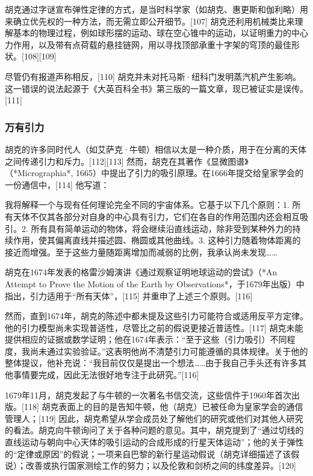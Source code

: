 胡克通过字谜宣布弹性定律的方式，是当时科学家（如胡克、惠更斯和伽利略）用来确立优先权的一种方法，而无需立即公开细节。[107] 胡克还利用机械类比来理解基本的物理过程，例如球形摆的运动、球在空心锥中的运动，以证明重力的中心力作用，以及带有点荷载的悬挂链网，用以寻找顶部承重十字架的穹顶的最佳形状。[108][109]

尽管仍有报道声称相反，[110] 胡克并未对托马斯·纽科门发明蒸汽机产生影响。这一错误的说法起源于《大英百科全书》第三版的一篇文章，现已被证实是误传。[111]

\subsubsection{万有引力}
胡克的许多同时代人（如艾萨克·牛顿）相信以太是一种介质，用于在分离的天体之间传递引力和斥力。[112][113] 然而，胡克在其著作《显微图谱》（*Micrographia*, 1665）中提出了引力的吸引原理。在1666年提交给皇家学会的一份通信中，[114] 他写道：

我将解释一个与现有任何理论完全不同的宇宙体系。它基于以下几个原则：1. 所有天体不仅其各部分对自身的中心具有引力，它们在各自的作用范围内还会相互吸引。2. 所有具有简单运动的物体，将会继续沿直线运动，除非受到某种外力的持续作用，使其偏离直线并描述圆、椭圆或其他曲线。3. 这种引力随着物体距离的接近而增强。至于这些力量随距离增加而减弱的比例，我承认尚未发现……

胡克在1674年发表的格雷沙姆演讲《通过观察证明地球运动的尝试》（*An Attempt to Prove the Motion of the Earth by Observations*，于1679年出版）中指出，引力适用于“所有天体”，[115] 并重申了上述三个原则。[116]

然而，直到1674年，胡克的陈述中都未提及这些引力可能符合或适用反平方定律。他的引力模型尚未实现普适性，尽管比之前的假说更接近普适性。[117] 胡克未能提供相应的证据或数学证明；他在1674年表示：“至于这些（引力吸引）不同程度，我尚未通过实验验证。”这表明他尚不清楚引力可能遵循的具体规律。关于他的整体提议，他补充说：“我目前仅仅是提出一个想法……由于我自己手头还有许多其他事情要完成，因此无法很好地专注于此研究。”[116]

1679年11月，胡克发起了与牛顿的一次著名书信交流，这些信件于1960年首次出版。[118] 胡克表面上的目的是告知牛顿，他（胡克）已被任命为皇家学会的通信管理人；[119] 因此，胡克希望从学会成员处了解他们的研究或他们对其他人研究的看法。胡克向牛顿询问了关于各种问题的意见。其中，胡克提到了“通过切线的直线运动与朝向中心天体的吸引运动的合成形成的行星天体运动”；他的关于弹性的“定律或原因”的假说；一项来自巴黎的新行星运动假说（胡克详细描述了该假说）；改善或执行国家测绘工作的努力；以及伦敦和剑桥之间的纬度差异。[120]  

